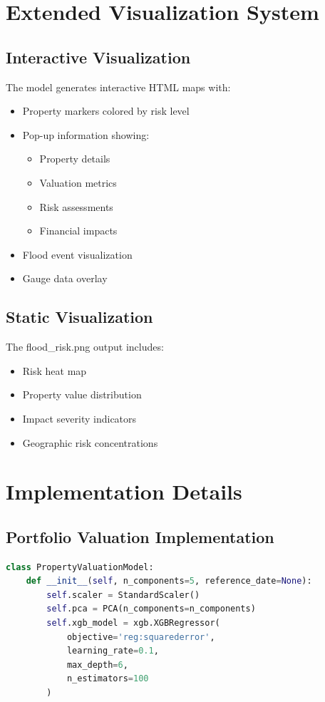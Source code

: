\documentclass{article}
\begin{document}
\section{Extended Visualization System}

\subsection{Interactive Visualization}
The model generates interactive HTML maps with:

\begin{itemize}
    \item Property markers colored by risk level
    \item Pop-up information showing:
    \begin{itemize}
        \item Property details
        \item Valuation metrics
        \item Risk assessments
        \item Financial impacts
    \end{itemize}
    \item Flood event visualization
    \item Gauge data overlay
\end{itemize}

\subsection{Static Visualization}
The flood\_risk.png output includes:

\begin{itemize}
    \item Risk heat map
    \item Property value distribution
    \item Impact severity indicators
    \item Geographic risk concentrations
\end{itemize}

\section{Implementation Details}

\subsection{Portfolio Valuation Implementation}
\begin{lstlisting}[language=Python]
class PropertyValuationModel:
    def __init__(self, n_components=5, reference_date=None):
        self.scaler = StandardScaler()
        self.pca = PCA(n_components=n_components)
        self.xgb_model = xgb.XGBRegressor(
            objective='reg:squarederror',
            learning_rate=0.1,
            max_depth=6,
            n_estimators=100
        )
\end{lstlisting}
\end{document}
